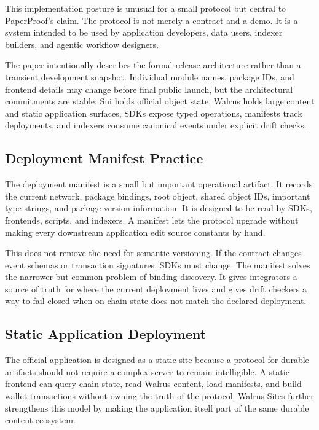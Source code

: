 \documentclass[journal]{IEEEtran}
\begin{document}
This implementation posture is unusual for a small protocol but central to PaperProof's claim. The protocol is not merely a contract and a demo. It is a system intended to be used by application developers, data users, indexer builders, and agentic workflow designers.

The paper intentionally describes the formal-release architecture rather than a transient development snapshot. Individual module names, package IDs, and frontend details may change before final public launch, but the architectural commitments are stable: Sui holds official object state, Walrus holds large content and static application surfaces, SDKs expose typed operations, manifests track deployments, and indexers consume canonical events under explicit drift checks.

\subsection{Deployment Manifest Practice}

The deployment manifest is a small but important operational artifact. It records the current network, package bindings, root object, shared object IDs, important type strings, and package version information. It is designed to be read by SDKs, frontends, scripts, and indexers. A manifest lets the protocol upgrade without making every downstream application edit source constants by hand.

This does not remove the need for semantic versioning. If the contract changes event schemas or transaction signatures, SDKs must change. The manifest solves the narrower but common problem of binding discovery. It gives integrators a source of truth for where the current deployment lives and gives drift checkers a way to fail closed when on-chain state does not match the declared deployment.

\subsection{Static Application Deployment}

The official application is designed as a static site because a protocol for durable artifacts should not require a complex server to remain intelligible. A static frontend can query chain state, read Walrus content, load manifests, and build wallet transactions without owning the truth of the protocol. Walrus Sites further strengthens this model by making the application itself part of the same durable content ecosystem.
\end{document}
